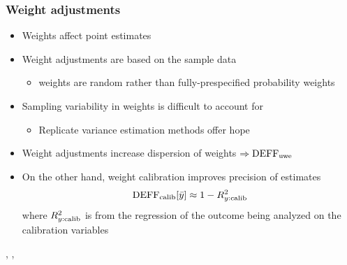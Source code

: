 \documentclass[handout]{beamer}
\begin{document}
\begin{frame}\frametitle{Weight adjustments}

\begin{itemize}
    \item Weights affect point estimates
    \item Weight adjustments are based on the sample data
        \begin{itemize} \item weights are random rather than fully-prespecified probability weights \end{itemize}
    \item Sampling variability in weights is difficult to account for
        \begin{itemize}
            \item Replicate variance estimation methods offer hope
        \end{itemize}
    \item Weight adjustments increase dispersion of weights $\Rightarrow {\rm DEFF}_{\rm uwe}$
    \item On the other hand, weight calibration improves precision of estimates
            $$
            {\rm DEFF}_{\rm calib} [\bar y] \approx 1 - R^2_{y:{\rm calib}}
            $$
            where $R^2_{y:{\rm calib}}$ is from the regression of the outcome being analyzed on the calibration variables
\end{itemize}

\medskip

\citet{deville:sarndal:1992},
\citet{henry:valliant:2015},
\citet{devaud:tille:2019}

\end{frame}
\end{document}
